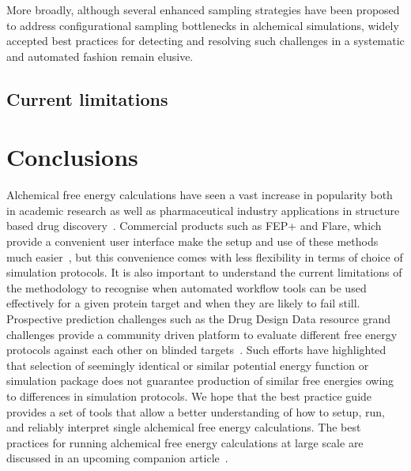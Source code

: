 \documentclass[9pt,bestpractices]{livecoms}
\begin{document}
More broadly, although several enhanced sampling strategies have been proposed to address configurational sampling bottlenecks in alchemical simulations, widely accepted best practices for detecting and resolving such challenges in a systematic and automated fashion remain elusive. 

\subsection{Current limitations}


\section{Conclusions}
\label{sec:conclusion}
Alchemical free energy calculations have seen a vast increase in popularity both in academic research as well as pharmaceutical industry applications in structure based drug discovery~\cite{schindler2020largescale, sherborne2016collaborating, wagner2017computational}. Commercial products such as FEP+ and Flare, which provide a convenient user interface make the setup and use of these methods much easier~\cite{wang2015accurate, kuhn2020assessment}, but this convenience comes with less flexibility in terms of choice of simulation protocols. It is also important to understand the current limitations of the methodology to recognise when automated workflow tools can be used effectively for a given protein target and when they are likely to fail still. Prospective prediction challenges such as the Drug Design Data resource grand challenges provide a community driven platform to evaluate different free energy protocols against each other on blinded targets~\cite{gaieb2018d3r, gaieb2019d3r}. Such efforts have highlighted that selection of seemingly identical or similar potential energy function or simulation package does not guarantee production of similar free energies owing to differences in simulation protocols. 
We hope that the best practice guide provides a set of tools that allow a better understanding of how to setup, run, and reliably interpret single alchemical free energy calculations. The best practices for running alchemical free energy calculations at large scale are discussed in an upcoming companion article~\cite{mey_largescale_inprep}.

\end{document}
